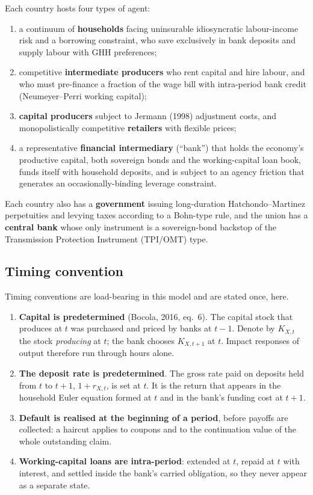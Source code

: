 \documentclass[11pt]{article}
\numberwithin{equation}{section}
\theoremstyle{definition}
\theoremstyle{plain}
\theoremstyle{remark}
\begin{document}
Each country hosts four types of agent:
\begin{enumerate}
\item a continuum of \textbf{households} facing uninsurable idiosyncratic labour-income
      risk and a borrowing constraint, who save exclusively in bank deposits and supply
      labour with GHH preferences;
\item competitive \textbf{intermediate producers} who rent capital and hire labour, and
      who must pre-finance a fraction of the wage bill with intra-period bank credit
      (Neumeyer--Perri working capital);
\item \textbf{capital producers} subject to Jermann (1998) adjustment costs, and
      monopolistically competitive \textbf{retailers} with flexible prices;
\item a representative \textbf{financial intermediary} (``bank'') that holds the
      economy's productive capital, both sovereign bonds and the working-capital loan
      book, funds itself with household deposits, and is subject to an agency friction
      that generates an occasionally-binding leverage constraint.
\end{enumerate}
Each country also has a \textbf{government} issuing long-duration
Hatchondo--Martinez perpetuities and levying taxes according to a Bohn-type rule, and
the union has a \textbf{central bank} whose only instrument is a sovereign-bond
backstop of the Transmission Protection Instrument (TPI/OMT) type.

\subsection{Timing convention}

Timing conventions are load-bearing in this model and are stated once, here.

\begin{enumerate}
\item \textbf{Capital is predetermined} (Bocola, 2016, eq.~6). The capital stock that
      produces at $t$ was purchased and priced by banks at $t-1$. Denote by $K_{X,t}$
      the stock \emph{producing} at $t$; the bank chooses $K_{X,t+1}$ at $t$. Impact
      responses of output therefore run through hours alone.
\item \textbf{The deposit rate is predetermined}. The gross rate paid on deposits held
      from $t$ to $t+1$, $1+r_{X,t}$, is set at $t$. It is the return that appears in
      the household Euler equation formed at $t$ and in the bank's funding cost at
      $t+1$.
\item \textbf{Default is realised at the beginning of a period}, before payoffs are
      collected: a haircut applies to coupons and to the continuation value of the
      whole outstanding claim.
\item \textbf{Working-capital loans are intra-period}: extended at $t$, repaid at $t$
      with interest, and settled inside the bank's carried obligation, so they never
      appear as a separate state.
\end{enumerate}
\end{document}
